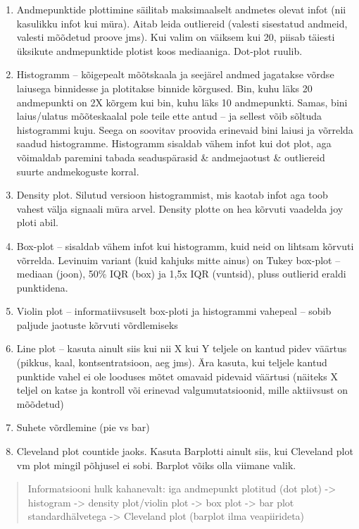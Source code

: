 \documentclass[]{book}
\begin{document}
\begin{enumerate}
\def\labelenumi{\alph{enumi}.}
\item
  Andmepunktide plottimine säilitab maksimaalselt andmetes olevat infot
  (nii kasulikku infot kui müra). Aitab leida outliereid (valesti
  sisestatud andmeid, valesti mõõdetud proove jms). Kui valim on väiksem
  kui 20, piisab täiesti üksikute andmepunktide plotist koos mediaaniga.
  Dot-plot ruulib.
\item
  Histogramm -- kõigepealt mõõtskaala ja seejärel andmed jagatakse
  võrdse laiusega binnidesse ja plotitakse binnide kõrgused. Bin, kuhu
  läks 20 andmepunkti on 2X kõrgem kui bin, kuhu läks 10 andmepunkti.
  Samas, bini laius/ulatus mõõteskaalal pole teile ette antud -- ja
  sellest võib sõltuda histogrammi kuju. Seega on soovitav proovida
  erinevaid bini laiusi ja võrrelda saadud histogramme. Histogramm
  sisaldab vähem infot kui dot plot, aga võimaldab paremini tabada
  seaduspärasid \& andmejaotust \& outliereid suurte andmekoguste
  korral.
\item
  Density plot. Silutud versioon histogrammist, mis kaotab infot aga
  toob vahest välja signaali müra arvel. Density plotte on hea kõrvuti
  vaadelda joy ploti abil.
\item
  Box-plot -- sisaldab vähem infot kui histogramm, kuid neid on lihtsam
  kõrvuti võrrelda. Levinuim variant (kuid kahjuks mitte ainus) on Tukey
  box-plot -- mediaan (joon), 50\% IQR (box) ja 1,5x IQR (vuntsid),
  pluss outlierid eraldi punktidena.
\item
  Violin plot -- informatiivsuselt box-ploti ja histogrammi vahepeal --
  sobib paljude jaotuste kõrvuti võrdlemiseks
\item
  Line plot -- kasuta ainult siis kui nii X kui Y teljele on kantud
  pidev väärtus (pikkus, kaal, kontsentratsioon, aeg jms). Ära kasuta,
  kui teljele kantud punktide vahel ei ole looduses mõtet omavaid
  pidevaid väärtusi (näiteks X teljel on katse ja kontroll või erinevad
  valgumutatsioonid, mille aktiivsust on mõõdetud)
\item
  Suhete võrdlemine (pie vs bar)
\item
  Cleveland plot countide jaoks. Kasuta Barplotti ainult siis, kui
  Cleveland plot vm plot mingil põhjusel ei sobi. Barplot võiks olla
  viimane valik.
\end{enumerate}

\begin{quote}
Informatsiooni hulk kahanevalt: iga andmepunkt plotitud (dot plot)
-\textgreater{} histogram -\textgreater{} density plot/violin plot
-\textgreater{} box plot -\textgreater{} bar plot standardhälvetega
-\textgreater{} Cleveland plot (barplot ilma veapiirideta)
\end{quote}
\end{document}
